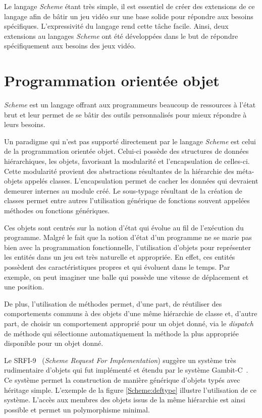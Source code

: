 \documentclass[12pt,twoside,letterpaper,francais]{book}
\newcommand{\Schemelang}{{\textit{Scheme }}}
\begin{document}
Le langage \Schemelang étant très simple, il est essentiel de créer
des extensions de ce langage afin de bâtir un jeu vidéo sur une base
solide pour répondre aux besoins spécifiques. L'expressivité du
langage rend cette tâche facile. Ainsi, deux extensions au langages
\Schemelang ont été développées dans le but de répondre spécifiquement
aux besoins des jeux vidéo.

\clearpage

\chapter{Programmation orientée objet}\label{Chap:OO}
\Schemelang est un langage offrant aux programmeurs beaucoup de ressources
à l'état brut et leur permet de se bâtir des outils personnalisés pour
mieux répondre à leurs besoins.

Un paradigme qui n'est pas supporté directement par le langage
\Schemelang est celui de la programmation orientée objet. Celui-ci
possède des structures de données hiérarchiques, les objets,
favorisant la modularité et l'encapsulation de celles-ci. Cette
modularité provient des abstractions résultantes de la hiérarchie des
méta-objets appelés classes. L'encapsulation permet de cacher les
données qui devraient demeurer internes au module créé.  Le
sous-typage résultant de la création de classes permet entre autres
l'utilisation générique de fonctions souvent appelées méthodes ou
fonctions génériques.

Ces objets sont centrés sur la notion d'état qui évolue au fil de
l'exécution du programme. Malgré le fait que la notion d'état d'un
programme ne se marie pas bien avec la programmation fonctionnelle,
l'utilisation d'objets pour représenter les entités dans un jeu est
très naturelle et appropriée. En effet, ces entités possèdent des
caractéristiques propres et qui évoluent dans le temps. Par exemple,
on peut imaginer une balle qui possède une vitesse de déplacement et
une position.

De plus, l'utilisation de méthodes permet, d'une part, de réutiliser
des comportements communs à des objets d'une même hiérarchie de classe
et, d'autre part, de choisir un comportement approprié pour
un objet donné, via le \textit{dispatch} de méthode qui sélectionne
automatiquement la méthode la plus appropriée disponible pour un objet
donné.

Le SRFI-9~\cite{SRFI_9} (\textit{Scheme Request For Implementation})
suggère un système très rudimentaire d'objets qui fut implémenté et
étendu par le système Gambit-C~\cite{Gambit4}. Ce système permet la
construction de manière générique d'objets typés avec héritage
simple. L'exemple de la figure \ref{Scheme:deftype} illustre
l'utilisation de ce système. L'accès aux membres des objets issus de
la même hiérarchie est ainsi possible et permet un polymorphisme
minimal.
\end{document}
